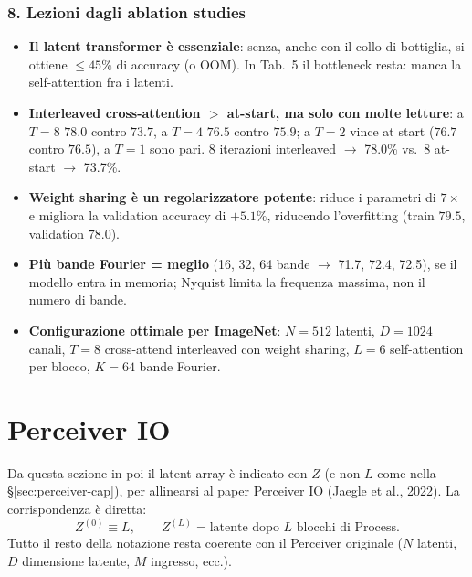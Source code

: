 \documentclass[
  11pt,
]{article}
\begin{document}
\subsubsection*{8. Lezioni dagli ablation studies}

\begin{notabox}[title={\textbf{Lezioni dagli ablation studies (sintesi)}}]
\begin{itemize}
  \item \textbf{Il latent transformer è essenziale}: senza, anche con il collo di bottiglia, si ottiene $\le 45\%$ di accuracy (o OOM). In Tab.~5 il bottleneck resta: manca la self-attention fra i latenti.
  \item \textbf{Interleaved cross-attention $>$ at-start, ma solo con molte letture}: a $T=8$ $78.0$ contro $73.7$, a $T=4$ $76.5$ contro $75.9$; a $T=2$ vince at start ($76.7$ contro $76.5$), a $T=1$ sono pari. 8 iterazioni interleaved $\to$ 78.0\% vs.\ 8 at-start $\to$ 73.7\%.
  \item \textbf{Weight sharing è un regolarizzatore potente}: riduce i parametri di $7\times$ e migliora la validation accuracy di $+5.1\%$, riducendo l'overfitting (train $79.5$, validation $78.0$).
  \item \textbf{Più bande Fourier = meglio} (16, 32, 64 bande $\to$ 71.7, 72.4, 72.5), se il modello entra in memoria; Nyquist limita la frequenza massima, non il numero di bande.
  \item \textbf{Configurazione ottimale per ImageNet}: $N=512$ latenti, $D=1024$ canali, $T=8$ cross-attend interleaved con weight sharing, $L=6$ self-attention per blocco, $K=64$ bande Fourier.
\end{itemize}
\end{notabox}

\clearpage
\section{Perceiver IO}
\label{sec:perceiver-io-sub}

\begin{notabox}[title={\textbf{Cambio di notazione: $Z$ al posto di $L$}}]
Da questa sezione in poi il latent array è indicato con $Z$ (e non $L$ come nella \S\ref{sec:perceiver-cap}), per allinearsi al paper Perceiver IO (Jaegle et al., 2022). La corrispondenza è diretta:
\[ Z^{(0)} \equiv L, \qquad Z^{(L)} = \text{latente dopo $L$ blocchi di Process}. \]
Tutto il resto della notazione resta coerente con il Perceiver originale ($N$ latenti, $D$ dimensione latente, $M$ ingresso, ecc.).
\end{notabox}
\end{document}
